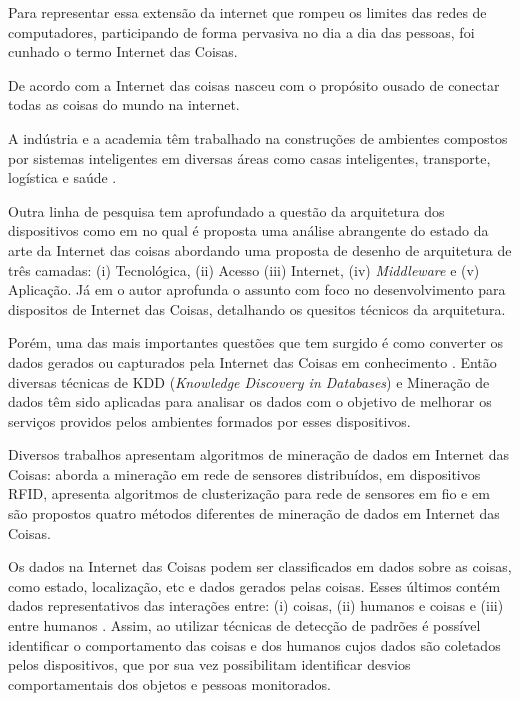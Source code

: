 \documentclass[12pt]{article}
\begin{document}
Para representar essa extensão da internet que rompeu os limites das redes de computadores, participando de forma pervasiva no dia a dia das pessoas, foi cunhado o termo Internet das Coisas.

De acordo com \cite{000-000} a Internet das coisas nasceu com o propósito ousado de conectar todas as coisas do mundo na internet.

A indústria e a academia têm trabalhado na construções de ambientes compostos por sistemas inteligentes em diversas áreas como casas inteligentes, transporte, logística e saúde \cite{000-000}.

Outra linha de pesquisa tem aprofundado a questão da arquitetura dos dispositivos como em \cite{000-006} no qual é proposta uma análise abrangente do estado da arte da Internet das coisas abordando uma proposta de desenho de arquitetura de três camadas: (i) Tecnológica, (ii) Acesso (iii) Internet, (iv) \textit{Middleware} e (v) Aplicação. Já em \cite{000-003} o autor aprofunda o assunto com foco no desenvolvimento para dispositos de Internet das Coisas, detalhando os quesitos técnicos da arquitetura.

Porém, uma das mais importantes questões que tem surgido é como converter os dados gerados ou capturados pela Internet das Coisas em conhecimento \cite{000-000}. Então diversas técnicas de KDD (\textit{Knowledge Discovery in Databases}) e Mineração de dados têm sido aplicadas para analisar os dados com o objetivo de melhorar os serviços providos pelos ambientes formados por esses dispositivos.

Diversos trabalhos apresentam algoritmos de mineração de dados em Internet das Coisas:  \cite{000-014} aborda a mineração em rede de sensores distribuídos,  \cite{000-015} em dispositivos RFID, \cite{000-056} apresenta algoritmos de clusterização para rede de sensores em fio e em \cite{003-000} são propostos quatro métodos diferentes de mineração de dados em Internet das Coisas.

Os dados na Internet das Coisas podem ser classificados em dados sobre as coisas, como estado, localização, etc e dados gerados pelas coisas. Esses últimos contém dados representativos das interações entre: (i) coisas, (ii) humanos e coisas e (iii) entre humanos \cite{000-018}. Assim, ao utilizar técnicas de detecção de padrões é possível identificar o comportamento das coisas e dos humanos cujos dados são coletados pelos dispositivos, que por sua vez possibilitam identificar desvios comportamentais dos objetos e pessoas monitorados. 
\end{document}
